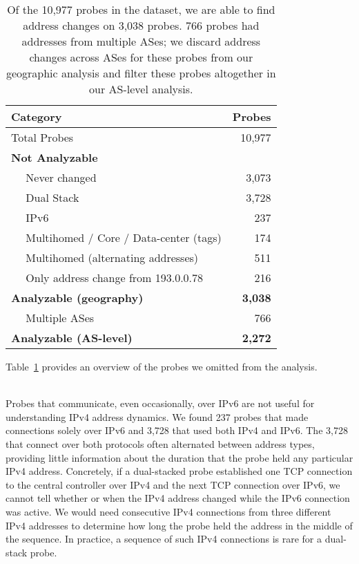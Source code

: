 \begin{table}[th]
  \small
  \centering
  \begin{tabular}{ l|r }
    \textbf{Category} & \textbf{Probes} \\
    \hline
    Total Probes & 10,977\\
    \hline
    \textbf{Not Analyzable} &  \\
    ~~ Never changed & 3,073\\
    ~~ Dual Stack & 3,728\\
    ~~ IPv6 & 237\\
    ~~ Multihomed / Core / Data-center (tags) &  174\\
    ~~ Multihomed (alternating addresses) & 511\\
    ~~ Only address change from 193.0.0.78 & 216 \\
    \hline
    \textbf{Analyzable (geography)} & \textbf{3,038} \\
    \hline
    ~~ Multiple ASes & 766\\
    \textbf{Analyzable (AS-level)} & \textbf{2,272} \\
    \end{tabular}
    \caption{Of the 10,977 probes in the dataset, we are able to find address changes on 3,038 probes. 766 probes had addresses from multiple ASes; we discard address changes across ASes for these probes from our geographic analysis and filter these probes altogether in our AS-level analysis.}
    \label{tbl:filtered}
\end{table}

Table~\ref{tbl:filtered} provides an overview of the probes
we omitted from the analysis.

\par {}\\
Probes that communicate, even occasionally, over IPv6 are not
useful for understanding IPv4 address dynamics.  We found 
237 probes that made connections solely over
IPv6 and 3,728 that used both IPv4 and IPv6.  The 3,728 that connect over both
protocols often alternated between address types, providing
little information about the duration that the probe held any particular
IPv4 address.  Concretely, if a dual-stacked probe established one TCP
connection to the central controller over IPv4 and the next TCP
connection over IPv6, we cannot tell whether or when the IPv4
address changed while the IPv6 connection was active.  We would need consecutive
IPv4 connections from three different IPv4 addresses to determine
how long the probe held the address in the middle of the sequence.   In
practice, a sequence of such IPv4 connections is rare for a dual-stack probe.

